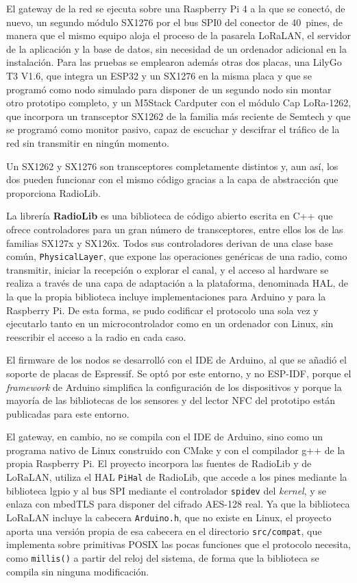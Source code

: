 El gateway de la red se ejecuta sobre una Raspberry Pi 4 a la que se conectó, de nuevo, un segundo módulo SX1276 por el bus SPI0 del conector de 40~pines, de manera que el mismo equipo aloja el proceso de la pasarela LoRaLAN, el servidor de la aplicación y la base de datos, sin necesidad de un ordenador adicional en la instalación. Para las pruebas se emplearon además otras dos placas, una LilyGo T3 V1.6, que integra un ESP32 y un SX1276 en la misma placa y que se programó como nodo simulado para disponer de un segundo nodo sin montar otro prototipo completo, y un M5Stack Cardputer con el módulo Cap LoRa-1262, que incorpora un transceptor SX1262 de la familia más reciente de Semtech y que se programó como monitor pasivo, capaz de escuchar y descifrar el tráfico de la red sin transmitir en ningún momento.

Un SX1262 y SX1276 son transceptores completamente distintos y, aun así, los dos pueden funcionar con el mismo código gracias a la capa de abstracción que proporciona RadioLib.

La librería \textbf{RadioLib} es una biblioteca de código abierto escrita en C++ que ofrece controladores para un gran número de transceptores, entre ellos los de las familias SX127x y SX126x. Todos sus controladores derivan de una clase base común, \texttt{PhysicalLayer}, que expone las operaciones genéricas de una radio, como transmitir, iniciar la recepción o explorar el canal, y el acceso al hardware se realiza a través de una capa de adaptación a la plataforma, denominada HAL, de la que la propia biblioteca incluye implementaciones para Arduino y para la Raspberry Pi. De esta forma, se pudo codificar el protocolo una sola vez y ejecutarlo tanto en un microcontrolador como en un ordenador con Linux, sin reescribir el acceso a la radio en cada caso. 

El firmware de los nodos se desarrolló con el IDE de Arduino, al que se añadió el soporte de placas de Espressif. Se optó por este entorno, y no ESP-IDF, porque el \textit{framework} de Arduino simplifica la configuración de los dispositivos y porque la mayoría de las bibliotecas de los sensores y del lector NFC del prototipo están publicadas para este entorno.

El gateway, en cambio, no se compila con el IDE de Arduino, sino como un programa nativo de Linux construido con CMake y con el compilador g++ de la propia Raspberry Pi. El proyecto incorpora las fuentes de RadioLib y de LoRaLAN, utiliza el HAL \texttt{PiHal} de RadioLib, que accede a los pines mediante la biblioteca lgpio y al bus SPI mediante el controlador \texttt{spidev} del \textit{kernel}, y se enlaza con mbedTLS para disponer del cifrado AES-128 real. Ya que la biblioteca LoRaLAN incluye la cabecera \texttt{Arduino.h}, que no existe en Linux, el proyecto aporta una versión propia de esa cabecera en el directorio \texttt{src/compat}, que implementa sobre primitivas POSIX las pocas funciones que el protocolo necesita, como \texttt{millis()} a partir del reloj del sistema, de forma que la biblioteca se compila sin ninguna modificación.

